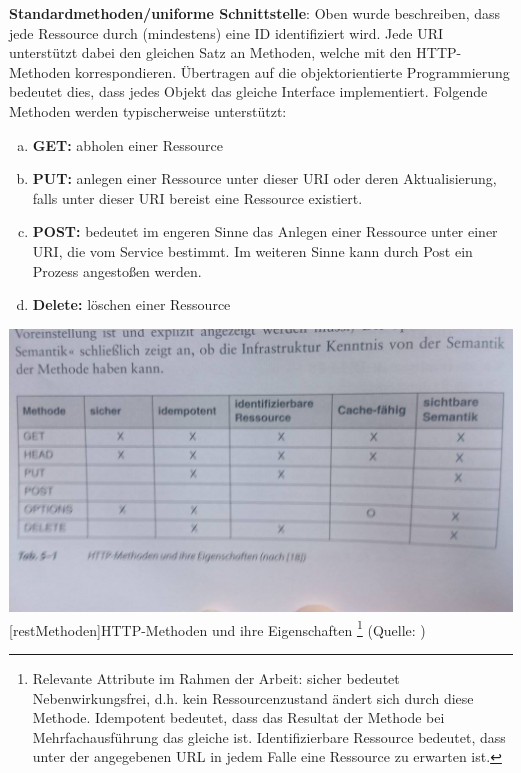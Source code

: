\documentclass[12pt,a4paper,bibliography=totocnumbered,listof=totoc]{scrartcl}
\begin{document}
\begin{compactitem}
\item \textbf{Standardmethoden/uniforme Schnittstelle}: Oben wurde beschreiben, dass jede Ressource durch (mindestens) eine ID identifiziert wird. Jede URI unterstützt dabei den gleichen Satz an Methoden, welche mit den HTTP-Methoden korrespondieren. Übertragen auf die objektorientierte Programmierung bedeutet dies, dass jedes Objekt das gleiche Interface implementiert. Folgende Methoden werden typischerweise unterstützt:
\begin{enumerate}[a.]
\item \textbf{GET:} abholen einer Ressource
\item \textbf{PUT:} anlegen einer Ressource unter dieser URI oder deren Aktualisierung, falls unter dieser URI bereist eine Ressource existiert.
\item \textbf{POST:} bedeutet im engeren Sinne das Anlegen einer Ressource unter einer URI, die vom Service bestimmt. Im weiteren Sinne kann durch Post ein Prozess angestoßen werden.
\item \textbf{Delete:} löschen einer Ressource
\end{enumerate}

\vspace{1em}
\begin{minipage}{\linewidth}
	\centering
	\includegraphics[width=0.7\linewidth]{Abbildungen/restMethoden.jpg}
	[restMethoden]{HTTP-Methoden und ihre Eigenschaften
	\footnote{Relevante Attribute im Rahmen der Arbeit: \glqq sicher\grqq{} bedeutet Nebenwirkungsfrei, d.h. kein Ressourcenzustand ändert sich durch diese Methode. \glqq Idempotent\grqq{} bedeutet, dass das Resultat der Methode bei Mehrfachausführung das gleiche ist. \glqq Identifizierbare Ressource\grqq{} bedeutet, dass unter der angegebenen URL in jedem Falle eine Ressource zu erwarten ist.}
	(Quelle: \citet{tilkov11})}
	\label{fig:restMethoden}
\end{minipage}
\vspace{1em}


\end{compactitem}
\end{document}
